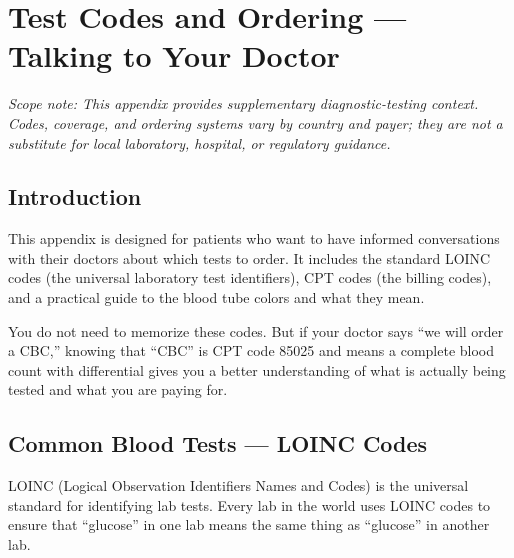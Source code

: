 \chapter{Test Codes and Ordering --- Talking to Your Doctor}
\label{app:test_codes}

\textit{Scope note: This appendix provides supplementary diagnostic-testing context. Codes, coverage, and ordering systems vary by country and payer; they are not a substitute for local laboratory, hospital, or regulatory guidance.}

\clearpage
\section{Introduction}

This appendix is designed for patients who want to have informed conversations with their doctors about which tests to order. It includes the standard LOINC codes (the universal laboratory test identifiers), CPT codes (the billing codes), and a practical guide to the blood tube colors and what they mean.

You do not need to memorize these codes. But if your doctor says ``we will order a CBC,'' knowing that ``CBC'' is CPT code 85025 and means a complete blood count with differential gives you a better understanding of what is actually being tested and what you are paying for.

\clearpage
\section{Common Blood Tests --- LOINC Codes}

LOINC (Logical Observation Identifiers Names and Codes) is the universal standard for identifying lab tests. Every lab in the world uses LOINC codes to ensure that ``glucose'' in one lab means the same thing as ``glucose'' in another lab.


